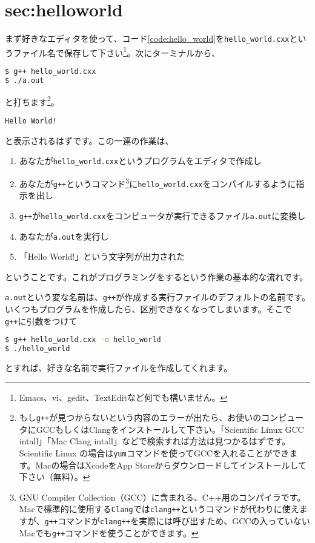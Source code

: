 \section{sec:helloworld}

まず好きなエディタを使って、コード\ref{code:hello_world}を\texttt{hello\_world.cxx}というファイル名で保存して下さい\footnote{Emacs、vi、gedit、TextEditなど何でも構いません。}。次にターミナルから、
\begin{lstlisting}[language=bash]
$ g++ hello_world.cxx
$ ./a.out
\end{lstlisting}
と打ちます\footnote{もし\texttt{g++}が見つからないという内容のエラーが出たら、お使いのコンピュータにGCCもしくはClangをインストールして下さい。「Scientific Linux GCC intall」「Mac Clang intall」などで検索すれば方法は見つかるはずです。Scientific Linux の場合は\texttt{yum}コマンドを使ってGCCを入れることができます。Macの場合はXcodeをApp Storeからダウンロードしてインストールして下さい（無料）。}。
\begin{lstlisting}
Hello World!
\end{lstlisting}
と表示されるはずです。この一連の作業は、
\begin{enumerate}
  \item あなたが\texttt{hello\_world.cxx}というプログラムをエディタで作成し
  \item あなたが\texttt{g++}というコマンド\footnote{GNU Compiler Collection（GCC）に含まれる、C++用のコンパイラです。Macで標準的に使用する\texttt{Clang}では\texttt{clang++}というコマンドが代わりに使えますが、\texttt{g++}コマンドが\texttt{clang++}を実際には呼び出すため、GCCの入っていないMacでも\texttt{g++}コマンドを使うことができます。}に\texttt{hello\_world.cxx}をコンパイルするように指示を出し
  \item \texttt{g++}が\texttt{hello\_world.cxx}をコンピュータが実行できるファイル\texttt{a.out}に変換し
  \item あなたが\texttt{a.out}を実行し
  \item 「Hello World!」という文字列が出力された
\end{enumerate}
ということです。これがプログラミングをするという作業の基本的な流れです。

\texttt{a.out}という変な名前は、\texttt{g++}が作成する実行ファイルのデフォルトの名前です。いくつもプログラムを作成したら、区別できなくなってしまいます。そこで\texttt{g++}に引数をつけて
\begin{lstlisting}[language=bash]
$ g++ hello_world.cxx -o hello_world
$ ./hello_world
\end{lstlisting}
とすれば、好きな名前で実行ファイルを作成してくれます。

